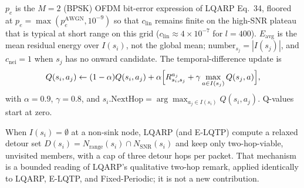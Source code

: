 $p_e$ is the $M=2$ (BPSK) OFDM bit-error expression of LQARP
Eq.~34, floored at $p_e=\max(p_e^{\mathrm{AWGN}},10^{-9})$ so that
$c_{\mathrm{lin}}$ remains finite on the high-SNR plateau that is
typical at short range on this grid
($c_{\mathrm{lin}}\approx 4\times 10^{-7}$ for $l=400$).
$E_{\mathrm{avg}}$ is the mean residual energy over $I(s_i)$, not
the global mean; $\mathrm{number}_{s_j}=|I(s_j)|$, and
$c_{\mathrm{nei}}=1$ when $s_j$ has no onward candidate.
The temporal-difference update is
\begin{equation}
\label{eq:q}
Q(s_i,a_j)
\leftarrow (1-\alpha)Q(s_i,a_j)
+\alpha\Bigl[R^{a_j}_{s_i,s_j}
+\gamma\max_{a\in I(s_j)}Q(s_j,a)\Bigr],
\end{equation}
with $\alpha=0.9$, $\gamma=0.8$, and
$s_i.\mathrm{NextHop}=\arg\max_{a_j\in I(s_i)}Q(s_i,a_j)$.
Q-values start at zero.

When $I(s_i)=\emptyset$ at a non-sink node, LQARP (and E-LQTP)
compute a relaxed detour set
$D(s_i)=N_{\mathrm{range}}(s_i)\cap N_{\mathrm{SNR}}(s_i)$
and keep only two-hop-viable, unvisited members, with a cap of
three detour hops per packet.
That mechanism is a bounded reading of LQARP's qualitative
two-hop remark, applied identically to LQARP, E-LQTP, and
Fixed-Periodic; it is not a new contribution.

